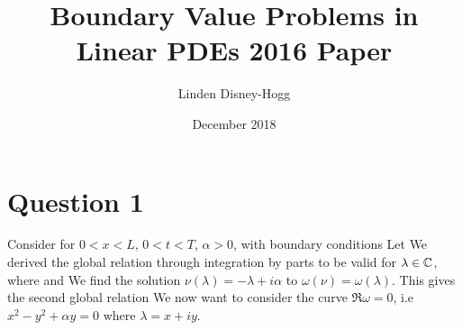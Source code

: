 \documentclass{article}
\title{Boundary Value Problems in Linear PDEs 2016 Paper}
\author{Linden Disney-Hogg}
\date{December 2018}
\begin{document}
\maketitle
\tableofcontents

\section{Question 1}
Consider 
for $0< x< L$, $0<t<T$, $\alpha > 0$, with boundary conditions 
Let 
We derived the global relation through integration by parts to be 
valid for $\lambda \in \mathbb{C}$, where 
and 
We find the solution $\nu(\lambda) = -\lambda + i\alpha$ to $\omega(\nu) = \omega(\lambda)$. This gives the second global relation 
We now want to consider the curve $\Re \omega = 0$, i.e $x^2 - y^2 + \alpha y = 0$ where $\lambda = x+iy$. 
\end{document}
